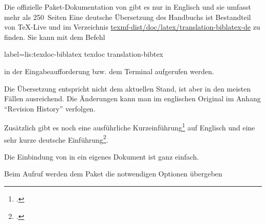 Die offizielle Paket-Dokumentation von  gibt es nur in Englisch und sie umfasst mehr als 250~Seiten
Eine deutsche Übersetzung des Handbuchs ist Bestandteil von TeX-Live und im Verzeichnis 
\url{texmf-dist/doc/latex/translation-biblatex-de} zu finden.
Sie kann mit dem Befehl

\begin{lfgwcode}{label={lis:texdoc-biblatex}}
texdoc translation-bibtex
\end{lfgwcode}

in der Eingabeaufforderung bzw. dem Terminal aufgerufen werden.

Die Übersetzung entspricht nicht dem aktuellen Stand, ist aber in den meisten Fällen ausreichend.
Die Änderungen kann man im englischen Original im Anhang \enquote{Revision History} verfolgen.

Zusätzlich gibt es noch eine ausführliche Kurzeinführung\footcite{biblatex-tutorial} auf Englisch 
und eine sehr kurze deutsche Einführung\footcite{biblatex-bottcher}.

Die Einbindung von  in ein eigenes Dokument ist ganz einfach.


Beim Aufruf werden dem Paket die notwendigen Optionen übergeben


